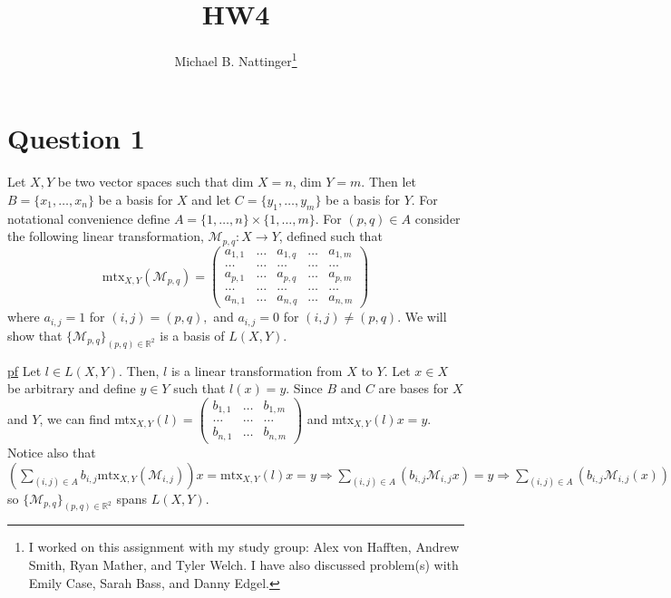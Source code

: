 \documentclass[11pt]{article} %
\title{HW4}
\author{Michael B. Nattinger\footnote{I worked on this assignment with my study group: Alex von Hafften, Andrew Smith, Ryan Mather, and Tyler Welch. I have also discussed problem(s) with Emily Case, Sarah Bass, and Danny Edgel.}}
\begin{document}
\maketitle

\section{Question 1}
Let $X,Y$ be two vector spaces such that dim $X = n$, dim $Y = m$. Then let $B = \{ x_1, \dots, x_n\} $ be a basis for $X$ and let $C = \{ y_1, \dots, y_m\}$ be a basis for $Y$. For notational convenience define $A = \{ 1 , \dots, n\} \times \{1, \dots,m \}$. For $(p,q) \in A$ consider the following linear transformation, $\mathcal{M}_{p,q}: X \rightarrow Y$, defined such that 
\begin{equation*}
\text{mtx}_{X,Y}(\mathcal{M}_{p,q}) = \begin{pmatrix}a_{1,1} & \dots  & a_{1,q} & \dots & a_{1,m} \\ \dots & \dots & \dots & \dots & \dots \\ a_{p,1} & \dots  & a_{p,q} & \dots & a_{p,m} \\ \dots & \dots & \dots & \dots & \dots \\ a_{n,1} & \dots  & a_{n,q} & \dots & a_{n,m} \end{pmatrix}
\end{equation*}
 where $a_{i,j} = 1$ for $(i,j) = (p,q),$ and $a_{i,j} = 0$ for $(i,j) \neq (p,q)$. We will show that $\{ \mathcal{M}_{p,q} \}_{(p,q) \in \mathbb{R}^2}$ is a basis of $L(X,Y).$

\underline{pf} Let $l \in L(X,Y)$. Then, $l$ is a linear transformation from $X$ to $Y$. Let $x \in X$ be arbitrary and define $y \in Y$ such that $l(x) = y$. Since $B$ and $C$ are bases for $X$ and $Y$, we can find mtx$_{X,Y}(l) = \begin{pmatrix}b_{1,1} & \dots  & b_{1,m} \\ \dots & \dots & \dots \\ b_{n,1} & \dots  & b_{n,m} \end{pmatrix}$ and mtx$_{X,Y}(l) x = y$. Notice also that $\left(\sum_{(i,j) \in A}  b_{i,j} \text{mtx}_{X,Y}(\mathcal{M}_{i,j})  \right) x = \text{mtx}_{X,Y}(l) x =  y \Rightarrow \sum_{(i,j) \in A} \left( b_{i,j} \mathcal{M}_{i,j}  x\right) = y \Rightarrow \sum_{(i,j) \in A} \left( b_{i,j} \mathcal{M}_{i,j}(x)  \right) = y $ so $\{ \mathcal{M}_{p,q} \}_{(p,q) \in \mathbb{R}^2}$ spans $L(X,Y)$.
\end{document}
